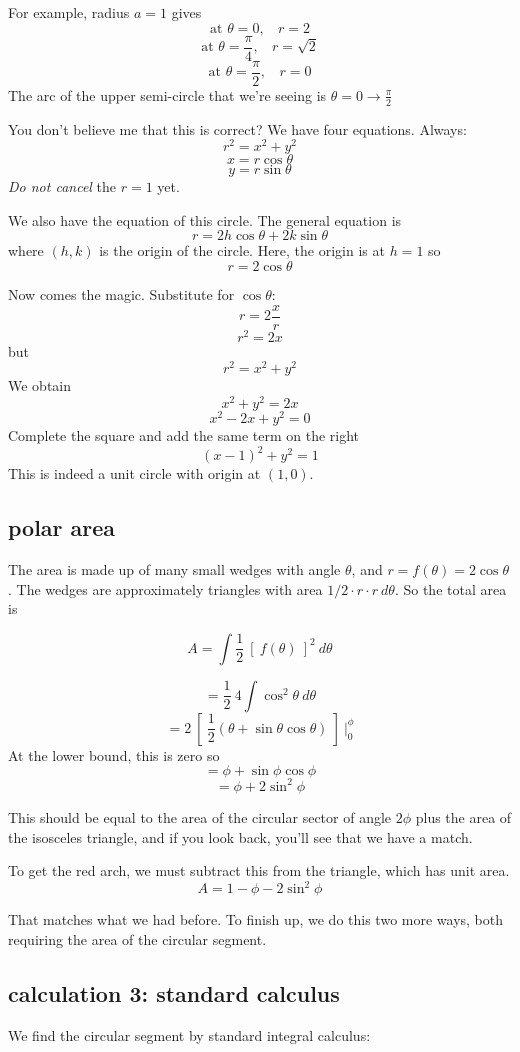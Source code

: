 \documentclass[11pt, oneside]{article}
\begin{document}
For example, radius $a = 1$ gives
\[ \text{at } \theta = 0, \ \ \ \ r = 2 \]
\[ \text{at } \theta = \frac{\pi}{4}, \ \ \ \ r = \sqrt{2} \]
\[ \text{at } \theta = \frac{\pi}{2}, \ \ \ \ r = 0 \]
The arc of the upper semi-circle that we're seeing is $\theta = 0 \rightarrow \frac{\pi}{2}$

You don't believe me that this is correct?  We have four equations.  Always:
\[ r^2 = x^2 + y^2 \]
\[ x = r \cos \theta  \]
\[ y = r \sin \theta  \]
\emph{Do not cancel} the $r = 1$ yet.

We also have the equation of this circle.  The general equation is
\[ r = 2h \cos \theta + 2k \sin \theta \]
where $(h,k)$ is the origin of the circle.  Here, the origin is at $h = 1$ so
\[ r = 2 \cos \theta \]

Now comes the magic.  Substitute for $\cos \theta $:
\[ r = 2 \frac{x}{r} \]
\[ r^2 = 2 x \]
but
\[ r^2 = x^2 + y^2  \]
We obtain
\[ x^2 + y^2 = 2x \]
\[ x^2 - 2x + y^2 = 0 \]
Complete the square and add the same term on the right
\[ (x - 1)^2 + y^2 = 1 \]
This is indeed a unit circle with origin at $(1,0)$.

\subsection*{polar area}

The area is made up of many small wedges with angle $\theta$, and $r = f(\theta) = 2 \cos \theta $.  The wedges are approximately triangles with area $1/2 \cdot r \cdot r \ d \theta$.  So the total area is

\[ A = \int \frac{1}{2} \ [ \ f(\theta) \ ]^2 \ d \theta \]

\[ = \frac{1}{2} \ 4 \int \cos^2 \theta \ d \theta\]
\[ = 2 \ [ \ \frac{1}{2} (\theta + \sin \theta \cos \theta) \ ] \ \bigg |_0^{\phi} \]
At the lower bound, this is zero so
\[ = \phi + \sin \phi \cos \phi \]
\[ = \phi + 2 \sin^2 \phi \]

This should be equal to the area of the circular sector of angle $2 \phi$ plus the area of the isosceles triangle, and if you look back, you'll see that we have a match.

To get the red arch, we must subtract this from the triangle, which has unit area.
\[ A = 1 - \phi - 2 \sin^2 \phi \]

That matches what we had before.  To finish up, we do this two more ways, both requiring the area of the circular segment.

\subsection*{calculation 3:  standard calculus}
We find the circular segment by standard integral calculus:
\end{document}
